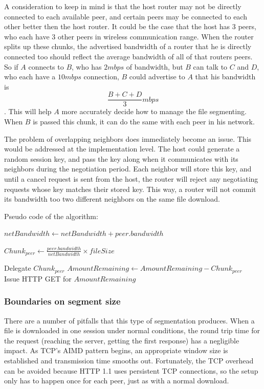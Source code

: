 \documentclass[12pt]{article}
\begin{document}
			A consideration to keep in mind is that the host router may not be directly connected to each available peer, and certain peers may be connected to each other better then the host router. It could be the case that the host has 3 peers, who each have 3 other peers in wireless communication range. When the router splits up these chunks, the advertised bandwidth of a router that he is directly connected too should reflect the average bandwidth of all of that routers peers. So if $A$ connects to $B$, who has $2 mbps$ of bandwidth, but $B$ can talk to $C$ and $D$, who each have a $10 mbps$ connection, $B$ could advertise to $A$ that his bandwidth is $$\frac{B + C + D}{3} mbps$$. This will help $A$ more accurately decide how to manage the file segmenting. When $B$ is passed this chunk, it can do the same with each peer in his network.

			The problem of overlapping neighbors does immediately become an issue. This would be addressed at the implementation level. The host could generate a random session key, and pass the key along when it communicates with its neighbors during the negotiation period. Each neighbor will store this key, and until a cancel request is sent from the host, the router will reject any negotiating requests whose key matches their stored key. This way, a router will not commit its bandwidth too two different neighbors on the same file download.

			Pseudo code of the algorithm:

			\begin{algorithmic}
					\State $netBandwidth\gets netBandwidth + peer.bandwidth$
				\EndFor

					\State $Chunk_{peer} \gets \frac{peer.bandwidth}{netBandwidth} \times{fileSize}$
				\EndFor

					Delegate $Chunk_{peer}$
					\State $AmountRemaining \gets AmountRemaining - Chunk_{peer}$
				\EndFor\\
				Issue HTTP GET for $AmountRemaining$
			\end{algorithmic}

		\subsubsection{Boundaries on segment size}

			There are a number of pitfalls that this type of segmentation produces. When a file is downloaded in one session under normal conditions, the round trip time for the request (reaching the server, getting the first response) has a negligible impact. As TCP's AIMD pattern begins, an appropriate window size is established and transmission time smooths out. Fortunately, the TCP overhead can be avoided because HTTP 1.1 uses persistent TCP connections, so the setup only has to happen once for each peer, just as with a normal download.
\end{document}

